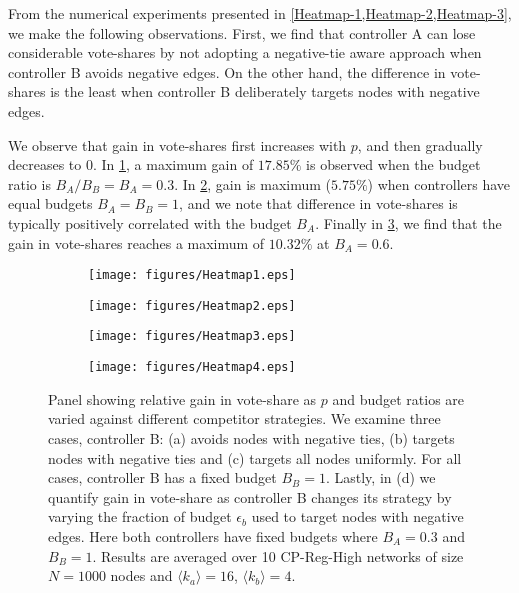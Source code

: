 From the numerical experiments presented in \cref{Heatmap-1,Heatmap-2,Heatmap-3}, we make the following observations. First, we find that controller A can lose considerable vote-shares by not adopting a negative-tie aware approach when controller B avoids negative edges.
On the other hand, the difference in vote-shares is the least when controller B deliberately targets nodes with negative edges. 

We observe that gain in vote-shares first increases with $p$, and then gradually decreases to $0$.  
In \cref{Heatmap-1}, a maximum gain of $17.85\%$ is observed when the budget ratio is $B_{A}/B_{B} = B_{A} = 0.3$.
In \cref{Heatmap-2}, gain is maximum ($5.75\%$) when controllers have equal budgets $B_{A} = B_{B} = 1$, and we note that difference in vote-shares is typically positively correlated with the budget $B_{A}$.
Finally in \cref{Heatmap-3}, we find that the gain in vote-shares reaches a maximum of $10.32\%$ at $B_{A}=0.6$.




\begin{figure}
  \begin{subfigure}[b]{0.45\textwidth}
    \texttt{[image: figures/Heatmap1.eps]}
    \caption{}
    \label{Heatmap-1}
  \end{subfigure}
\hspace{2em}
  \begin{subfigure}[b]{0.45\textwidth}
    \texttt{[image: figures/Heatmap2.eps]}
    \caption{}
    \label{Heatmap-2}
  \end{subfigure}

  \begin{subfigure}[b]{0.45\textwidth}
    \texttt{[image: figures/Heatmap3.eps]}
    \caption{}
    \label{Heatmap-3}
  \end{subfigure}
   \hspace{2em}
  \begin{subfigure}[b]{0.45\textwidth}
    \texttt{[image: figures/Heatmap4.eps]}
    \caption{}
    \label{Heatmap-4}
  \end{subfigure}
\caption{Panel showing relative gain in vote-share as $p$ and budget ratios are varied against different competitor strategies. We examine three cases, controller B: (a) avoids nodes with negative ties, (b) targets nodes with negative ties and (c) targets all nodes uniformly. For all cases, controller B has a fixed budget $B_{B}=1$.
Lastly, in (d) we quantify gain in vote-share as controller B changes its strategy by varying the fraction of budget $\epsilon_{b}$ used to target nodes with negative edges. Here both controllers have fixed budgets where $B_{A} = 0.3$ and $B_{B}=1$. 
Results are averaged over 10 CP-Reg-High networks of size $N = 1000$ nodes and $\langle k_{a} \rangle =16$, $\langle k_{b} \rangle = 4$. }
\end{figure}

